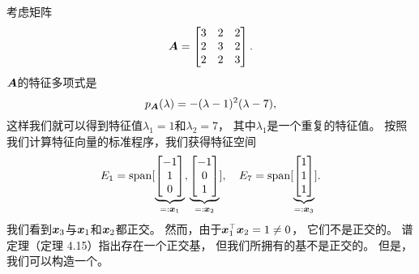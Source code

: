 \begin{example}
    考虑矩阵
    \begin{equation}
        \boldsymbol{A} =
        \begin{bmatrix}
            3 & 2 & 2 \\
            2 & 3 & 2 \\
            2 & 2 & 3 \\
        \end{bmatrix}.
    \end{equation}
    $\boldsymbol{A}$的特征多项式是
    \begin{equation}
        p_{\boldsymbol{A}}(\lambda) = -(\lambda - 1)^2 (\lambda - 7),
    \end{equation}
    这样我们就可以得到特征值$\lambda_1 = 1$和$\lambda_2 = 7$，
    其中$\lambda_1$是一个重复的特征值。
    按照我们计算特征向量的标准程序，我们获得特征空间
    \begin{equation}
        E_1 =
        \mathrm{span}[
            \underbrace{
            \begin{bmatrix}
                -1 \\ 1 \\ 0
            \end{bmatrix}
            }_{=:\boldsymbol{x}_1},
            \underbrace{
            \begin{bmatrix}
                -1 \\ 0 \\ 1
            \end{bmatrix}
            }_{=:\boldsymbol{x}_2}
        ],
        \quad
        E_7 =
        \mathrm{span}[
            \underbrace{
            \begin{bmatrix}
                1 \\ 1 \\ 1
            \end{bmatrix}
            }_{=:\boldsymbol{x}_3}
        ].
    \end{equation}
    我们看到$\boldsymbol{x}_3$与$\boldsymbol{x}_1$和$\boldsymbol{x}_2$都正交。
    然而，由于$\boldsymbol{x}_1^\top \boldsymbol{x}_2 = 1 \neq 0$，
    它们不是正交的。
    谱定理（定理 4.15）指出存在一个正交基，
    但我们所拥有的基不是正交的。
    但是，我们可以构造一个。


\end{example}
